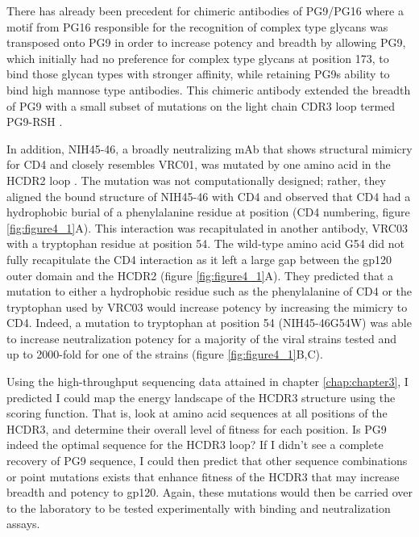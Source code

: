 There has already been precedent for chimeric antibodies of PG9/PG16 where a motif from PG16 responsible for the recognition of complex type glycans was transposed onto PG9 in order to increase potency and breadth by allowing PG9, which initially had no preference for complex type glycans at position 173, to bind those glycan types with stronger affinity, while retaining PG9s ability to bind high mannose type antibodies. This chimeric antibody extended the breadth of PG9 with a small subset of mutations on the light chain CDR3 loop termed PG9-RSH \citep{Pancera:2013ev}.

In addition, NIH45-46, a broadly neutralizing mAb that shows structural mimicry for CD4 and closely resembles VRC01, was mutated by one amino acid in the HCDR2 loop \citep{Scheid:2011js,Diskin:2011hl}. The mutation was not computationally designed; rather, they aligned the bound structure of NIH45-46 with CD4 and observed that CD4 had a hydrophobic burial of a phenylalanine residue at position (CD4 numbering, figure \ref{fig:figure4_1}A). This interaction was recapitulated in another antibody, VRC03 with a tryptophan residue at position 54. The wild-type amino acid G54 did not fully recapitulate the CD4 interaction as it left a large gap between the gp120 outer domain and the HCDR2 (figure \ref{fig:figure4_1}A). They predicted that a mutation to either a hydrophobic residue such as the phenylalanine of CD4 or the tryptophan used by VRC03 would increase potency by increasing the mimicry to CD4. Indeed, a mutation to tryptophan at position 54 (NIH45-46G54W) was able to increase neutralization potency for a majority of the viral strains tested and up to 2000-fold for one of the strains (figure \ref{fig:figure4_1}B,C).

Using the high-throughput sequencing data attained in chapter \ref{chap:chapter3}, I predicted I could map the energy landscape of the HCDR3 structure using the \rosetta scoring function. That is, look at amino acid sequences at all positions of the HCDR3, and determine their overall level of fitness for each position. Is PG9 indeed the optimal sequence for the HCDR3 loop? If I didn't see a complete recovery of PG9 sequence, I could then predict that other sequence combinations or point mutations exists that enhance fitness of the HCDR3 that may increase breadth and potency to gp120. Again, these mutations would then be carried over to the laboratory to be tested experimentally with binding and neutralization assays.

